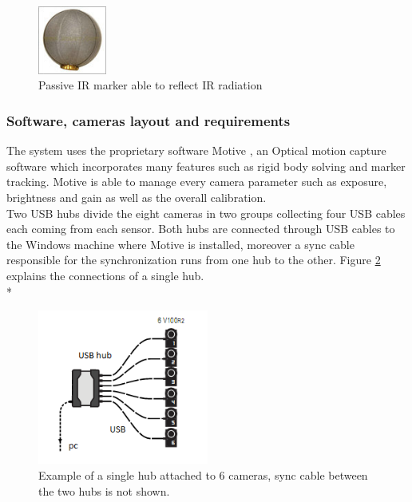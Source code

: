 \begin{figure}[h]
\centering
 \includegraphics[width=0.2\textwidth]{marker.jpg}
 \caption[Passive IR marker]{Passive IR marker able to reflect IR radiation}
 \label{figure:marker}
\end{figure}


\subsubsection{Software, cameras layout and requirements} 

The system uses the proprietary software Motive \cite{OptiT}, an Optical motion capture software which incorporates many features such as rigid body solving and marker tracking. Motive is able to manage every camera parameter such as exposure, brightness and gain as well as the overall calibration.\\ 

Two USB hubs divide the eight cameras in two groups collecting four USB cables each coming from each sensor. Both hubs are connected through USB cables to the Windows machine where Motive is installed, moreover a sync cable responsible for the synchronization runs from one hub to the other.
Figure \ref{figure:hub} explains the connections of a single hub.
\\*

\begin{figure}[H]
\centering
 \includegraphics[width=0.5\textwidth]{HUB.png}
 \caption[Single hub connection]{Example of a single hub attached to 6 cameras, sync cable between the two hubs is not shown.}
 \label{figure:hub}
\end{figure}

